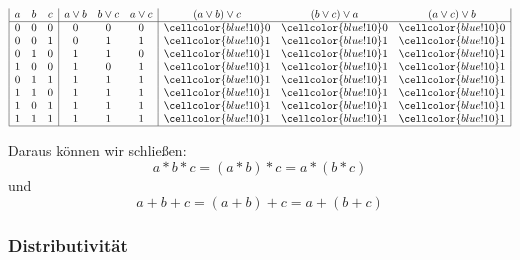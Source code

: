 \documentclass{article}
\begin{document}
    \begin{center}
        \vspace{2em}
        $\begin{array}{| c c c | c c c | c c c| }
            a & b & c & a \lor b & b \lor c  & a \lor c  & (a \lor b) \lor c  & (b \lor c) \lor a  & (a \lor c) \lor b \\ 
            \hline 
            0 & 0 & 0 & 0 & 0 & 0 & \cellcolor{blue!10} 0 & \cellcolor{blue!10}0   & \cellcolor{blue!10} 0  \\
            
            0 & 0 & 1 & 0 & 1 & 1 & \cellcolor{blue!10}1 & \cellcolor{blue!10}1  & \cellcolor{blue!10}1  \\
            0 & 1 & 0 & 1 & 1 & 0 & \cellcolor{blue!10}1 & \cellcolor{blue!10}1  & \cellcolor{blue!10}1  \\
            1 & 0 & 0 & 1 & 0 & 1 & \cellcolor{blue!10}1 & \cellcolor{blue!10}1  &\cellcolor{blue!10} 1  \\
    
            0 & 1 & 1 & 1 & 1 & 1 & \cellcolor{blue!10}1 & \cellcolor{blue!10}1  & \cellcolor{blue!10}1  \\
            1 & 1 & 0 & 1 & 1 & 1 & \cellcolor{blue!10}1 & \cellcolor{blue!10}1  & \cellcolor{blue!10}1  \\
            1 & 0 & 1 & 1 & 1 & 1 & \cellcolor{blue!10}1 & \cellcolor{blue!10}1  & \cellcolor{blue!10}1  \\
        
            1 & 1 & 1 & 1 & 1 & 1 & \cellcolor{blue!10}1 & \cellcolor{blue!10}1  & \cellcolor{blue!10}1  \\
            \hline 
         
        \end{array}$ \\ 
        \end{center}
    \begin{info}
        Daraus können wir schließen: 
        \begin{equation*}
            a*b*c = (a*b)*c = a*(b*c) 
        \end{equation*}
        und 
        \begin{equation*}
            a+b+c = (a+b)+c = a+(b+c) 
        \end{equation*}
    \end{info}
    

\subsubsection{Distributivität}
\end{document}

